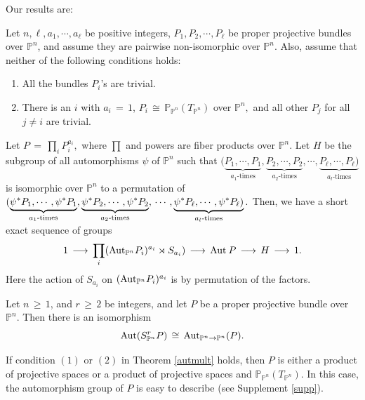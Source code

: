 \documentclass[12pt,reqno]{amsart}
\newenvironment{manualtheorem}[1]{%
\renewcommand\themanualtheoreminner{#1}%
  \manualtheoreminner
}{\endmanualtheoreminner}
\theoremstyle{definition}
\numberwithin{equation}{section}
\begin{document}
 Our results are:
 
\begin{manualtheorem}{C} \label{autmult}
Let $n, \ell ,a_{1},\cdots,a_{\ell}$ be positive integers, $ P_{1}, P_{2}, \cdots, P_{\ell}$ be proper projective bundles over $ \mathbb{P}^n$, and assume they are pairwise non-isomorphic over $ \mathbb{P}^n$. Also, assume that neither of the following conditions holds:
\begin{enumerate}
\item[$(1)$] All the bundles $P_{i}$'s are trivial.
\item[$(2)$] There is an $i$ with $ a_{i}\,=\,1$, $ P_{i} \,\cong\, \mathbb{P}_{\mathbb{P}^n}(T_{\mathbb{P}^n})$ over $ \mathbb{P}^n,$ and all other $P_{j}$ for all $ j \neq i$ are trivial.
\end{enumerate}
Let $ P\,=\, \prod_{i}P_{i}^{a_{i}},$ where $ \prod$ and powers are fiber products over $ \mathbb{P}^n.$  Let $H$ be the subgroup of all automorphisms $ \psi$ of $\mathbb{P}^n $ such that $ (\underbrace{P_{1},\cdots,P_{1}}_{a_{1}\text{-times}}, \underbrace{P_{2},\cdots,P_{2}}_{a_{2}\text{-times}},\cdots, \underbrace{P_{\ell},\cdots,P_{\ell})}_{a_{l}\text{-times}}$ is isomorphic over $\mathbb{P}^n$ to a permutation of $ (\underbrace{\psi^{\ast}P_{1},\cdots, \psi^{\ast}P_{1}}_{a_{1}\text{-times}}, \underbrace{\psi^{\ast}P_{2}, \cdots, \psi^{\ast}P_{2}}_{a_{2}\text{-times}}, \\\cdots, \underbrace{\psi^{\ast}P_{\ell},\cdots,\psi^{\ast}P_{\ell})}_{a_{l}\text{-times}}.$
Then, we have a short exact sequence of groups 
$$ 1 \,\longrightarrow\, \prod_{i}(\textnormal{Aut}_{\mathbb{P}^n} P_{i})^{a_{i}} \rtimes S_{a_{i}}) \,\longrightarrow\, \textnormal{Aut} \medspace P \,\longrightarrow\, H \,\longrightarrow\, 1.$$ Here the action of $S_{a_{i}}$ on $ (\textnormal{Aut}_{\mathbb{P}^n}P_{i})^{a_{i}}$ is by permutation of the factors.   
   
\end{manualtheorem}

\begin{manualtheorem}{D}\label{autsym}
Let $ n\,\geq\, 1$, and $ r\,\geq\, 2$ be integers, and let $P$ be a proper projective bundle over $ \mathbb{P}^n.$ Then there is an isomorphism $$ \textnormal{Aut}(S^{r}_{\mathbb{P}^n}P) \,\cong\, \textnormal{Aut}_{\mathbb{P}^n\rightarrow \mathbb{P}^n}(P).$$ 
\end{manualtheorem}

If condition $(1)$ or $(2)$ in Theorem \ref{autmult} holds, then $P$ is either a product of projective spaces or a product of projective spaces and $\mathbb{P}_{\mathbb{P}^n}(T_{\mathbb{P}^n})$. In this case, the automorphism group of $P$ is easy to describe (see Supplement \ref{supp}). 
\end{document}
